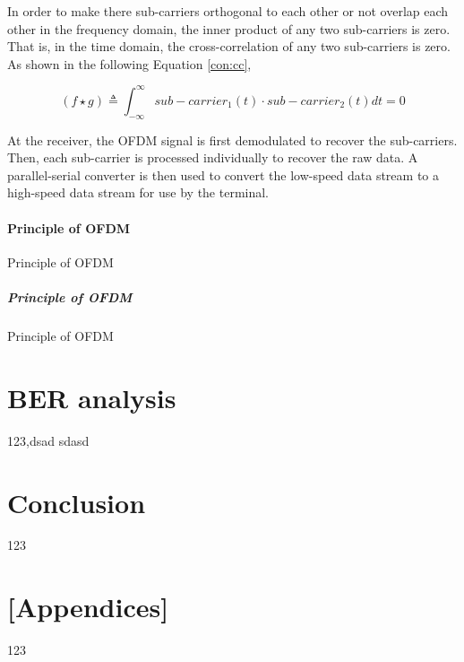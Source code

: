 \documentclass{article}
\begin{document}
In order to make there sub-carriers orthogonal to each other or not overlap each other in the frequency domain, the inner product of any two sub-carriers is zero. That is, in the time domain, the cross-correlation of any two sub-carriers is zero. As shown in the following Equation \ref{con:cc},

\begin{equation}
(f \star g) \triangleq \int_{-\infty}^{\infty} sub-carrier_1(t) \cdot sub-carrier_2(t)dt=0 \label{con:cc}
\end{equation}

At the receiver, the OFDM signal is first demodulated to recover the sub-carriers. Then, each sub-carrier is processed individually to recover the raw data. A parallel-serial converter is then used to convert the low-speed data stream to a high-speed data stream for use by the terminal.

\paragraph{Principle of OFDM}
Principle of OFDM

\subparagraph{Principle of OFDM}
Principle of OFDM


\section{BER analysis}
123\cite{RN79},dsad
sdasd

\section{Conclusion}
123





\section{[Appendices]}
123


	
\end{document}
